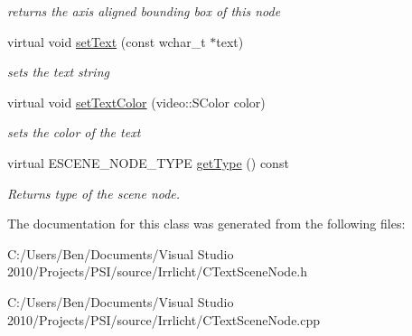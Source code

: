 \begin{DoxyCompactItemize}
\begin{DoxyCompactList}\small\item\em returns the axis aligned bounding box of this node \end{DoxyCompactList}\item 
\hypertarget{classirr_1_1scene_1_1_c_text_scene_node_a59b68aca7c5cc11b702d61fa40339537}{virtual void \hyperlink{classirr_1_1scene_1_1_c_text_scene_node_a59b68aca7c5cc11b702d61fa40339537}{set\-Text} (const wchar\-\_\-t $\ast$text)}\label{classirr_1_1scene_1_1_c_text_scene_node_a59b68aca7c5cc11b702d61fa40339537}

\begin{DoxyCompactList}\small\item\em sets the text string \end{DoxyCompactList}\item 
\hypertarget{classirr_1_1scene_1_1_c_text_scene_node_ac6984abfdb5abc9cd6a66342550192e8}{virtual void \hyperlink{classirr_1_1scene_1_1_c_text_scene_node_ac6984abfdb5abc9cd6a66342550192e8}{set\-Text\-Color} (video\-::\-S\-Color color)}\label{classirr_1_1scene_1_1_c_text_scene_node_ac6984abfdb5abc9cd6a66342550192e8}

\begin{DoxyCompactList}\small\item\em sets the color of the text \end{DoxyCompactList}\item 
\hypertarget{classirr_1_1scene_1_1_c_text_scene_node_ab67b09fe57e1386b2ac264b8a768704c}{virtual E\-S\-C\-E\-N\-E\-\_\-\-N\-O\-D\-E\-\_\-\-T\-Y\-P\-E \hyperlink{classirr_1_1scene_1_1_c_text_scene_node_ab67b09fe57e1386b2ac264b8a768704c}{get\-Type} () const }\label{classirr_1_1scene_1_1_c_text_scene_node_ab67b09fe57e1386b2ac264b8a768704c}

\begin{DoxyCompactList}\small\item\em Returns type of the scene node. \end{DoxyCompactList}\end{DoxyCompactItemize}


The documentation for this class was generated from the following files\-:\begin{DoxyCompactItemize}
\item 
C\-:/\-Users/\-Ben/\-Documents/\-Visual Studio 2010/\-Projects/\-P\-S\-I/source/\-Irrlicht/C\-Text\-Scene\-Node.\-h\item 
C\-:/\-Users/\-Ben/\-Documents/\-Visual Studio 2010/\-Projects/\-P\-S\-I/source/\-Irrlicht/C\-Text\-Scene\-Node.\-cpp\end{DoxyCompactItemize}
